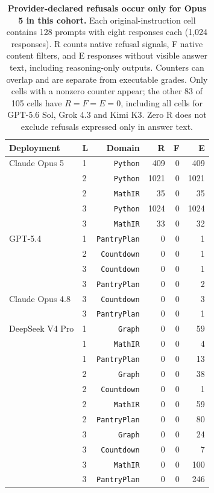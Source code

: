 \begin{table}[!htbp]
  \centering
  \caption{\textbf{Provider-declared refusals occur only for Opus 5 in this cohort.} Each original-instruction cell contains 128 prompts with eight responses each (1,024 responses). R counts native refusal signals, F native content filters, and E responses without visible answer text, including reasoning-only outputs. Counters can overlap and are separate from executable grades. Only cells with a nonzero counter appear; the other 83 of 105 cells have $R=F=E=0$, including all cells for GPT-5.6 Sol, Grok 4.3 and Kimi K3. Zero R does not exclude refusals expressed only in answer text.}
  \label{tab:hosted-provider-outcomes}
  \small
  \setlength{\tabcolsep}{5pt}
  \begin{tabular}{@{}llrrrr@{}}
    \toprule
    \textbf{Deployment} & \textbf{L} & \textbf{Domain} &
      \textbf{R} & \textbf{F} & \textbf{E} \\
    \midrule
    Claude Opus 5 & 1 & \texttt{Python} & 409 & 0 & 409 \\
     & 2 & \texttt{Python} & 1021 & 0 & 1021 \\
     & 2 & \texttt{MathIR} & 35 & 0 & 35 \\
     & 3 & \texttt{Python} & 1024 & 0 & 1024 \\
     & 3 & \texttt{MathIR} & 33 & 0 & 32 \\
    GPT-5.4 & 1 & \texttt{PantryPlan} & 0 & 0 & 1 \\
     & 2 & \texttt{Countdown} & 0 & 0 & 1 \\
     & 3 & \texttt{Countdown} & 0 & 0 & 1 \\
     & 3 & \texttt{PantryPlan} & 0 & 0 & 2 \\
    Claude Opus 4.8 & 3 & \texttt{Countdown} & 0 & 0 & 3 \\
     & 3 & \texttt{PantryPlan} & 0 & 0 & 1 \\
    DeepSeek V4 Pro & 1 & \texttt{Graph} & 0 & 0 & 59 \\
     & 1 & \texttt{MathIR} & 0 & 0 & 4 \\
     & 1 & \texttt{PantryPlan} & 0 & 0 & 13 \\
     & 2 & \texttt{Graph} & 0 & 0 & 38 \\
     & 2 & \texttt{Countdown} & 0 & 0 & 1 \\
     & 2 & \texttt{MathIR} & 0 & 0 & 59 \\
     & 2 & \texttt{PantryPlan} & 0 & 0 & 80 \\
     & 3 & \texttt{Graph} & 0 & 0 & 24 \\
     & 3 & \texttt{Countdown} & 0 & 0 & 7 \\
     & 3 & \texttt{MathIR} & 0 & 0 & 100 \\
     & 3 & \texttt{PantryPlan} & 0 & 0 & 246 \\
    \bottomrule
  \end{tabular}
\end{table}

